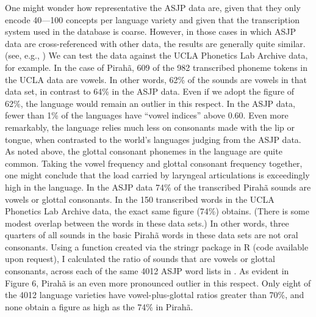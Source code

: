 \documentclass[output=paper,colorlinks,citecolor=brown
]{langscibook}
\begin{document}
    One might wonder how representative the ASJP data are, given that they only encode 40—100 concepts per language variety and given that the transcription system used in the database is coarse. However, in those cases in which ASJP data are cross-referenced with other data, the results are generally quite similar. (see, e.g., ) We can test the data against the UCLA Phonetics Lab Archive data, for example. In the case of Pirahã, 609 of the 982 transcribed phoneme tokens in the UCLA data are vowels. In other words, 62\% of the sounds are vowels in that data set, in contrast to 64\% in the ASJP data. Even if we adopt the figure of 62\%, the language would remain an outlier in this respect. In the ASJP data, fewer than 1\% of the languages have “vowel indices” above 0.60.
    Even more remarkably, the language relies much less on consonants made with the lip or tongue, when contrasted to the world’s languages judging from the ASJP data. As noted above, the glottal consonant phonemes in the language are quite common. Taking the vowel frequency and glottal consonant frequency together, one might conclude that the load carried by laryngeal articulations is exceedingly high in the language. In the ASJP data 74\% of the transcribed Pirahã sounds are vowels or glottal consonants. In the 150 transcribed words in the UCLA Phonetics Lab Archive data, the exact same figure (74\%) obtains. (There is some modest overlap between the words in these data sets.) In other words, three quarters of all sounds in the basic Pirahã words in these data sets are not oral consonants. Using a function created via the stringr package in R (code available upon request), I calculated the ratio of sounds that are vowels or glottal consonants, across each of the same 4012 ASJP word lists in . As evident in Figure 6, Pirahã is an even more pronounced outlier in this respect. Only eight of the 4012 language varieties have vowel-plus-glottal ratios greater than 70\%, and none obtain a figure as high as the 74\% in Pirahã.
\end{document}
